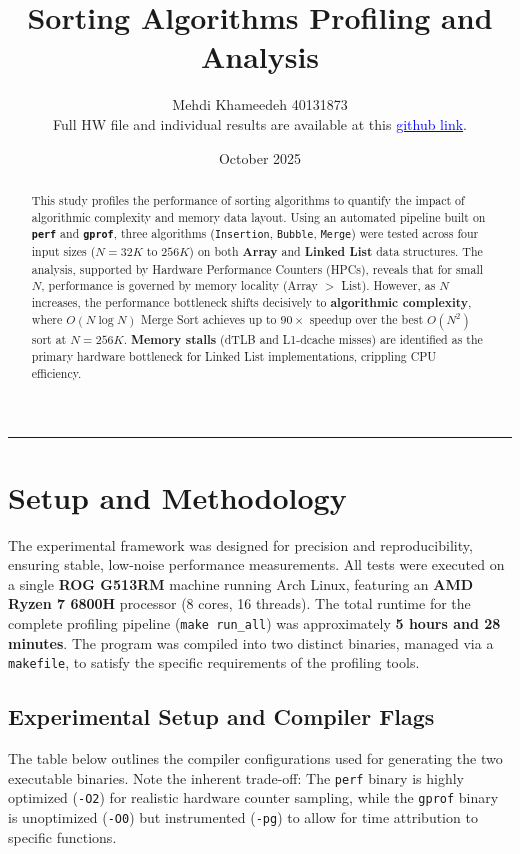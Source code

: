 \documentclass[11pt, a4paper]{article}
\title{Sorting Algorithms Profiling and Analysis}
\author{Mehdi Khameedeh 40131873\\Full HW file and individual results are available at this \href{https://github.com/Khameedeh/GPU-programming-Fall2025/tree/main/homeworks/homework-1/problem-1}{\textcolor{blue}{github link}}.
}
\date{October 2025}
\begin{document}
\maketitle

\vspace{0.5cm}

\begin{abstract}
This study profiles the performance of sorting algorithms to quantify the impact of algorithmic complexity and memory data layout. Using an automated pipeline built on \textbf{\texttt{perf}} and \textbf{\texttt{gprof}}, three algorithms (\texttt{Insertion}, \texttt{Bubble}, \texttt{Merge}) were tested across four input sizes ($N=32K$ to $256K$) on both \textbf{Array} and \textbf{Linked List} data structures. The analysis, supported by Hardware Performance Counters (HPCs), reveals that for small $N$, performance is governed by memory locality (Array $>$ List). However, as $N$ increases, the performance bottleneck shifts decisively to \textbf{algorithmic complexity}, where $O(N \log N)$ Merge Sort achieves up to $90\times$ speedup over the best $O(N^2)$ sort at $N=256K$. \textbf{Memory stalls} (dTLB and L1-dcache misses) are identified as the primary hardware bottleneck for Linked List implementations, crippling CPU efficiency.
\end{abstract}

\hrule
\vspace{0.3cm}

\section{Setup and Methodology}

The experimental framework was designed for precision and reproducibility, ensuring stable, low-noise performance measurements. All tests were executed on a single \textbf{ROG G513RM} machine running Arch Linux, featuring an \textbf{AMD Ryzen 7 6800H} processor (8 cores, 16 threads). The total runtime for the complete profiling pipeline (\texttt{make run\_all}) was approximately \textbf{5 hours and 28 minutes}. The program was compiled into two distinct binaries, managed via a \texttt{makefile}, to satisfy the specific requirements of the profiling tools.

\subsection{Experimental Setup and Compiler Flags}
The table below outlines the compiler configurations used for generating the two executable binaries. Note the inherent trade-off: The \texttt{perf} binary is highly optimized (\texttt{-O2}) for realistic hardware counter sampling, while the \texttt{gprof} binary is unoptimized (\texttt{-O0}) but instrumented (\texttt{-pg}) to allow for time attribution to specific functions.
\end{document}
